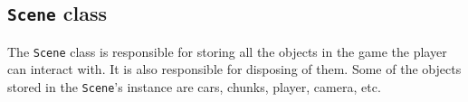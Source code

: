 \subsection{\texttt{Scene} class} \label{subsec:scene-class}
The \texttt{Scene} class is responsible for storing all the objects in the game the player can interact with.
It is also responsible for disposing of them.
Some of the objects stored in the \texttt{Scene}'s instance are cars, chunks, player, camera, etc.